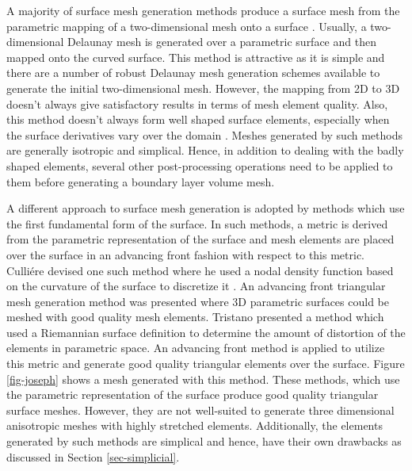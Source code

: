 
A majority of surface mesh generation methods produce a surface mesh from the parametric mapping of a two-dimensional mesh onto a surface \cite{george1998delaunay, chen1997delaunay}. Usually, a two-dimensional Delaunay mesh is generated over a parametric surface and then mapped onto the curved surface. This method is attractive as it is simple and there are a number of robust Delaunay mesh generation schemes available to generate the initial two-dimensional mesh. However, the mapping from 2D to 3D doesn't always give satisfactory results in terms of mesh element quality. Also, this method doesn't always form well shaped surface elements, especially when the surface derivatives vary over the domain \cite{owen1998survey}. Meshes generated by such methods are generally isotropic and simplical. Hence, in addition to dealing with the badly shaped elements, several other post-processing operations need to be applied to them before generating a boundary layer volume mesh.


A different approach to surface mesh generation is adopted by methods which use the first fundamental form of the surface. In such methods, a metric is derived from the parametric representation of the surface and mesh elements are placed over the surface in an advancing front fashion with respect to this metric. Culli\'ere devised one such method where he used a nodal density function based on the curvature of the surface to discretize it \cite{cuilliere1998adaptive}. An advancing front triangular mesh generation method was presented where 3D parametric surfaces could be meshed with good quality mesh elements. Tristano \etal \cite{tristano1998advancing} presented a method which used a Riemannian surface definition to determine the amount of distortion of the elements in parametric space. An advancing front method is applied to utilize this metric and generate good quality triangular elements over the surface. Figure \ref{fig-joseph} shows a mesh generated with this method. These methods, which use the parametric representation of the surface produce good quality triangular surface meshes. However, they are not well-suited to generate three dimensional anisotropic meshes with highly stretched elements. Additionally, the elements generated by such methods are simplical and hence, have their own drawbacks as discussed in Section \ref{sec-simplicial}.

